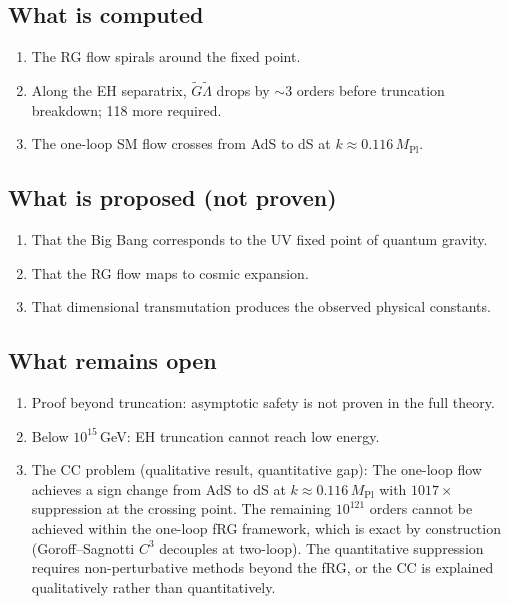 \documentclass[12pt]{article}
\begin{document}
\subsection{What is computed}

\begin{enumerate}
\item The RG flow spirals around the fixed point.
\item Along the EH separatrix, $\tilde G\tilde\Lambda$ drops by $\sim3$ orders before truncation breakdown; 118 more required.
\item The one-loop SM flow crosses from AdS to dS at $k\approx0.116\,M_{\text{Pl}}$.
\end{enumerate}

\subsection{What is proposed (not proven)}

\begin{enumerate}
\item That the Big Bang corresponds to the UV fixed point of quantum gravity.
\item That the RG flow maps to cosmic expansion.
\item That dimensional transmutation produces the observed physical constants.
\end{enumerate}

\subsection{What remains open}

\begin{enumerate}
\item Proof beyond truncation: asymptotic safety is not proven in the full theory.
\item Below $10^{15}$\,GeV: EH truncation cannot reach low energy.
\item The CC problem (qualitative result, quantitative gap): The one-loop flow achieves a sign change from AdS to dS at $k\approx0.116\,M_{\text{Pl}}$ with $1017\times$ suppression at the crossing point. The remaining $10^{121}$ orders cannot be achieved within the one-loop fRG framework, which is exact by construction (Goroff--Sagnotti $C^3$ decouples at two-loop). The quantitative suppression requires non-perturbative methods beyond the fRG, or the CC is explained qualitatively rather than quantitatively.
\end{enumerate}
\end{document}
